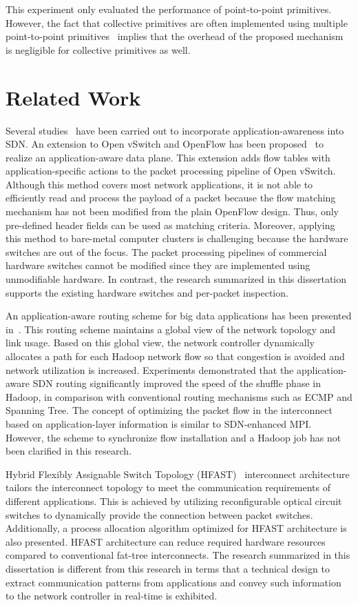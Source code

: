 This experiment only evaluated the performance of point-to-point
primitives. However, the fact that collective primitives are often
implemented using multiple point-to-point
primitives~\autocite{Squyres2005,mvapich} implies that the overhead
of the proposed mechanism is negligible for collective primitives as
well.

\section{Related Work}\label{sec:iv-related-work}

Several studies~\autocite{Mekky2014,Cheng2014} have been carried out
to incorporate application-awareness into SDN\@. An extension to Open
vSwitch and OpenFlow has been proposed~\autocite{Mekky2014} to realize
an application-aware data plane. This extension adds flow tables with
application-specific actions to the packet processing pipeline of Open
vSwitch. Although this method covers most network applications, it is
not able to efficiently read and process the payload of a packet because
the flow matching mechanism has not been modified from the plain
OpenFlow design. Thus, only pre-defined header fields can be used as
matching criteria. Moreover, applying this method to bare-metal computer
clusters is challenging because the hardware switches are out of the
focus. The packet processing pipelines of commercial hardware switches
cannot be modified since they are implemented using unmodifiable
hardware. In contrast, the research summarized in this dissertation supports
the existing hardware switches and per-packet inspection.

An application-aware routing scheme for big data applications has been
presented in~\autocite{Cheng2014}. This routing scheme maintains a
global view of the network topology and link usage. Based on this global
view, the network controller dynamically allocates a path for each
Hadoop network flow so that congestion is avoided and network
utilization is increased. Experiments demonstrated that the
application-aware SDN routing significantly improved the speed of the
shuffle phase in Hadoop, in comparison with conventional routing
mechanisms such as ECMP and Spanning Tree. The concept of optimizing the
packet flow in the interconnect based on application-layer information
is similar to SDN-enhanced MPI\@. However, the scheme to synchronize flow
installation and a Hadoop job has not been clarified in this research.

Hybrid Flexibly Assignable Switch Topology (HFAST)~\autocite{Kamil2007}
interconnect architecture tailors the interconnect topology to meet the
communication requirements of different applications. This is achieved
by utilizing reconfigurable optical circuit switches to dynamically
provide the connection between packet switches. Additionally, a process
allocation algorithm optimized for HFAST architecture is also presented.
HFAST architecture can reduce required hardware resources compared to
conventional fat-tree interconnects. The research summarized in this
dissertation is different from this research in terms that a technical design
to extract communication patterns from applications and convey such
information to the network controller in real-time is exhibited.

